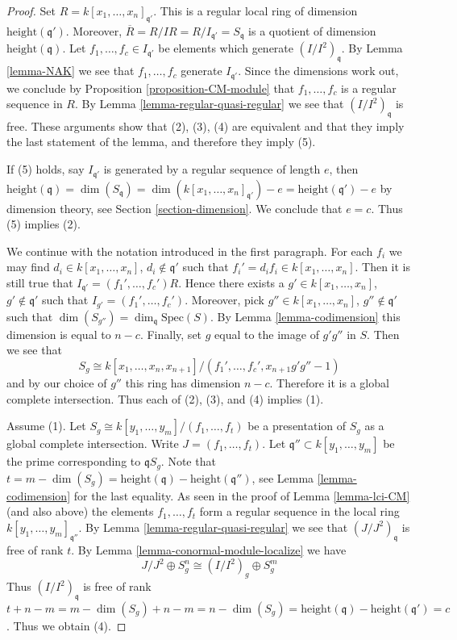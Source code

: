\begin{proof}
Set $R = k[x_1, \ldots, x_n]_{\mathfrak q'}$. This is a regular local
ring of dimension $\text{height}(\mathfrak q')$. Moreover,
$\overline{R} = R/IR = R/I_{\mathfrak q'} = S_{\mathfrak q}$
is a quotient of dimension $\text{height}(\mathfrak q)$.
Let $f_1, \ldots, f_c \in I_{\mathfrak q'}$ be elements
which generate $(I/I^2)_{\mathfrak q}$. By Lemma \ref{lemma-NAK}
we see that $f_1, \ldots, f_c$ generate $I_{\mathfrak q'}$.
Since the dimensions work out, we conclude
by Proposition \ref{proposition-CM-module} that
$f_1, \ldots, f_c$ is a regular sequence in $R$.
By Lemma \ref{lemma-regular-quasi-regular} we see that
$(I/I^2)_{\mathfrak q}$ is free.
These arguments show that (2), (3), (4) are equivalent and
that they imply the last statement of the lemma, and therefore
they imply (5).

\medskip\noindent
If (5) holds, say $I_{\mathfrak q'}$ is generated by a regular
sequence of length $e$, then
$\text{height}(\mathfrak q) = \dim(S_{\mathfrak q}) = 
\dim(k[x_1, \ldots, x_n]_{\mathfrak q'}) - e =
\text{height}(\mathfrak q') - e$ by dimension theory,
see Section \ref{section-dimension}. We conclude that $e = c$.
Thus (5) implies (2).

\medskip\noindent
We continue with the notation introduced in the first paragraph.
For each $f_i$ we may find $d_i \in k[x_1, \ldots, x_n]$,
$d_i \not \in \mathfrak q'$ such that
$f_i' = d_i f_i \in k[x_1, \ldots, x_n]$.
Then it is still true that $I_{\mathfrak q'} = (f_1', \ldots, f_c')R$.
Hence there exists a $g' \in k[x_1, \ldots, x_n]$, $g' \not \in \mathfrak q'$
such that $I_{g'} = (f_1', \ldots, f_c')$.
Moreover, pick $g'' \in k[x_1, \ldots, x_n]$, $g'' \not \in \mathfrak q'$
such that $\dim(S_{g''}) = \dim_{\mathfrak q} \text{Spec}(S)$.
By Lemma \ref{lemma-codimension} this dimension is equal to $n - c$.
Finally, set $g$ equal to the image of $g'g''$ in $S$.
Then we see that
$$
S_g \cong k[x_1, \ldots, x_n, x_{n + 1}]
/
(f_1', \ldots, f_c', x_{n + 1}g'g'' - 1)
$$
and by our choice of $g''$ this ring has dimension $n - c$.
Therefore it is a global complete intersection.
Thus each of (2), (3), and (4) implies (1).

\medskip\noindent
Assume (1). Let $S_g \cong k[y_1, \ldots, y_m]/(f_1, \ldots, f_t)$
be a presentation of $S_g$ as a global complete intersection.
Write $J = (f_1, \ldots, f_t)$. Let $\mathfrak q'' \subset k[y_1, \ldots, y_m]$
be the prime corresponding to $\mathfrak qS_g$. Note that
$t = m - \dim(S_g) =
\text{height}(\mathfrak q) - \text{height}(\mathfrak q'')$,
see Lemma \ref{lemma-codimension} for the last equality.
As seen in the proof of Lemma \ref{lemma-lci-CM} (and also above) the elements
$f_1, \ldots, f_t$ form a regular sequence in the local ring
$k[y_1, \ldots, y_m]_{\mathfrak q''}$.
By Lemma \ref{lemma-regular-quasi-regular} we see that
$(J/J^2)_{\mathfrak q}$ is free of rank $t$.
By Lemma \ref{lemma-conormal-module-localize} we have
$$
J/J^2 \oplus S_g^n \cong (I/I^2)_g \oplus S_g^m
$$
Thus $(I/I^2)_{\mathfrak q}$ is free of rank
$t + n - m = m - \dim(S_g) + n - m = n - \dim(S_g) =
\text{height}(\mathfrak q) - \text{height}(\mathfrak q') = c$.
Thus we obtain (4).
\end{proof}


